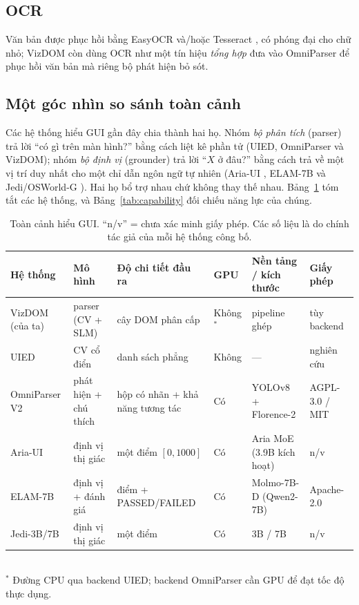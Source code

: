\documentclass[11pt,a4paper]{article}
\begin{document}
\subsection{OCR}
Văn bản được phục hồi bằng EasyOCR \cite{easyocr} và/hoặc Tesseract \cite{tesseract},
có phóng đại cho chữ nhỏ; VizDOM còn dùng OCR như một tín hiệu \emph{tổng hợp} đưa
vào OmniParser để phục hồi văn bản mà riêng bộ phát hiện bỏ sót.

\subsection{Một góc nhìn so sánh toàn cảnh}
Các hệ thống hiểu GUI gần đây chia thành hai họ. Nhóm \emph{bộ phân tích} (parser)
trả lời ``có gì trên màn hình?'' bằng cách liệt kê phần tử (UIED, OmniParser và
VizDOM); nhóm \emph{bộ định vị} (grounder) trả lời ``$X$ ở đâu?'' bằng cách trả về
một vị trí duy nhất cho một chỉ dẫn ngôn ngữ tự nhiên (Aria-UI \cite{ariaui2024},
ELAM-7B \cite{elam7b} và Jedi/OSWorld-G \cite{osworldg}). Hai họ bổ trợ nhau chứ
không thay thế nhau. Bảng~\ref{tab:models} tóm tắt các hệ thống, và
Bảng~\ref{tab:capability} đối chiếu năng lực của chúng.

\begin{table}[H]
  \centering\footnotesize
  \caption{Toàn cảnh hiểu GUI. ``n/v'' = chưa xác minh giấy phép. Các số liệu là do
  chính tác giả của mỗi hệ thống công bố.}
  \label{tab:models}
  \begin{tabular}{@{}p{2.4cm}p{2.5cm}p{2.7cm}p{0.8cm}p{2.3cm}p{2.0cm}@{}}
    \toprule
    Hệ thống & Mô hình & Độ chi tiết đầu ra & GPU & Nền tảng / kích thước & Giấy phép \\
    \midrule
    VizDOM (của ta) & parser (CV + SLM) & cây DOM phân cấp & Không$^\ast$ & pipeline ghép & tùy backend \\
    UIED & CV cổ điển & danh sách phẳng & Không & --- & nghiên cứu \\
    OmniParser V2 & phát hiện + chú thích & hộp có nhãn + khả năng tương tác & Có & YOLOv8 + Florence-2 & AGPL-3.0 / MIT \\
    Aria-UI & định vị thị giác & một điểm $[0,1000]$ & Có & Aria MoE (3.9B kích hoạt) & n/v \\
    ELAM-7B & định vị + đánh giá & điểm + PASSED/FAILED & Có & Molmo-7B-D (Qwen2-7B) & Apache-2.0 \\
    Jedi-3B/7B & định vị thị giác & một điểm & Có & 3B / 7B & n/v \\
    \bottomrule
  \end{tabular}\\[0.3em]
  {\footnotesize $^\ast$ Đường CPU qua backend UIED; backend OmniParser cần GPU để đạt tốc độ thực dụng.}
\end{table}
\end{document}
